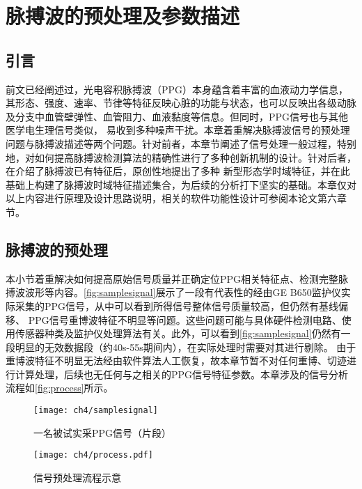 \chapter{脉搏波的预处理及参数描述}
\section{引言}
前文已经阐述过，光电容积脉搏波（PPG）本身蕴含着丰富的血液动力学信息，其形态、强度、速率、节律等特征反映心脏的功能与状态，也可以反映出各级动脉及分支中血管壁弹性、血管阻力、血液黏度等信息。但同时，PPG信号也与其他医学电生理信号类似，
易收到多种噪声干扰。本章着重解决脉搏波信号的预处理问题与脉搏波描述等两个问题。针对前者，本章节阐述了信号处理一般过程，特别地，对如何提高脉搏波检测算法的精确性进行了多种创新机制的设计。针对后者，在介绍了脉搏波已有特征后，原创性地提出了多种
新型形态学时域特征，并在此基础上构建了脉搏波时域特征描述集合，为后续的分析打下坚实的基础。本章仅对以上内容进行原理及设计思路说明，相关的软件功能性设计可参阅本论文第六章节。
\section{脉搏波的预处理}
本小节着重解决如何提高原始信号质量并正确定位PPG相关特征点、检测完整脉搏波波形等内容。\autoref{fig:samplesignal}展示了一段有代表性的经由GE B650监护仪实际采集的PPG信号，从中可以看到所得信号整体信号质量较高，但仍然有基线偏移、
PPG信号重博波特征不明显等问题。这些问题可能与具体硬件检测电路、使用传感器种类及监护仪处理算法有关。此外，可以看到\autoref{fig:samplesignal}仍然有一段明显的无效数据段（约40s-55s期间内），在实际处理时需要对其进行剔除。
由于重博波特征不明显无法经由软件算法人工恢复，故本章节暂不对任何重博、切迹进行计算处理，后续也无任何与之相关的PPG信号特征参数。本章涉及的信号分析流程如\autoref{fig:process}所示。
\begin{figure}[htbp]
    \centering
    \texttt{[image: ch4/samplesignal]}
    \caption{\label{fig:samplesignal}一名被试实采PPG信号（片段）}
\end{figure}
\begin{figure}[htbp]
    \centering
    \texttt{[image: ch4/process.pdf]}
    \caption{\label{fig:process}信号预处理流程示意}
\end{figure}

